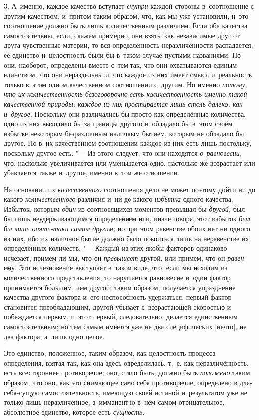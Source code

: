 3. А~именно, каждое качество вступает {\em внутри} каждой стороны в~соотношение
с другим качеством, и~притом таким образом, что, как мы уже установили, и~это
соотношение должно быть лишь количественным различием. Если оба качества
самостоятельны, если, скажем примерно, они взяты как независимые друг от друга
чувственные материи, то вся определённость неразличённости распадается; её
единство и~целостность были бы в~таком случае пустыми названиями. Но они,
наоборот, определены вместе с~тем так, что они охватываются единым единством,
что они нераздельны и~что каждое из них имеет смысл и~реальность только в~этом
одном качественном соотношении с~другим. Но именно {\em потому, что их
количественность безоговорочно есть количественность именно такой качественной
природы, каждое из них простирается лишь столь далеко, как и~другое}. Поскольку
они различались бы просто как определённые количества, одно из них выходило бы
за границы другого и~обладало бы в~этом своём избытке некоторым безразличным
наличным бытием, которым не обладало бы другое. Но в~их качественном
соотношении каждое из них есть лишь постольку, поскольку другое есть. "--- Из
этого следует, что они находятся {\em в~равновесии,} что, насколько
увеличивается или уменьшается одно, настолько же возрастает или убавляется
также и~другое, именно в~том же отношении.

На основании их {\em качественного} соотношения дело не может поэтому дойти ни
до какого {\em количественного} различия и~ни до какого {\em избытка} одного
качества. Избыток, которым {\em один} из соотносящихся моментов превышал бы
{\em другой,} был бы лишь неудерживающимся определением или, иначе говоря, этот
избыток {\em был бы лишь опять-таки самим другим;} но при этом равенстве обоих
нет ни одного из них, ибо их наличное бытие должно было покоиться лишь на
неравенстве их определённых количеств. "--- Каждый из этих якобы факторов
одинаково исчезает, примем ли мы, что он {\em превышает} другой, или примем,
что он {\em равен} ему. Это исчезновение выступает в~таком виде, что, если мы
исходим из количественного представления, то нарушается равновесие и~один
фактор принимается б\'{о}льшим, чем другой; таким образом, получается
упразднение качества другого фактора и~его неспособность удержаться; первый
фактор становится преобладающим, другой убывает с~возрастающей скоростью и
побеждается первым, и~этот первый, следовательно, делается единственным
самостоятельным; но тем самым имеется уже не два специфических [нечто], не два
фактора, а~лишь одно целое.

Это единство, положенное, таким образом, как целостность процесса определения,
взятая так, как она здесь определилась, т.~е. как неразличённость, есть
всестороннее противоречие; оно, стало быть, должно быть {\em положено} таким
образом, что оно, как это снимающее само себя противоречие, определено в
для-себя-сущую самостоятельность, имеющую своей истиной и~результатом уже не
только лишь неразличенное, а~имманентно в~нём самом отрицательное, абсолютное
единство, которое есть {\em сущность}.

